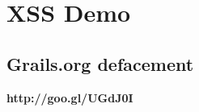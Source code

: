 
\section{XSS Demo}

\subsection{Grails.org defacement}


{
\begin{frame}[plain]
  \vspace{-6cm}
  \begin{center}
    \LARGE\bfseries
    http://goo.gl/UGdJ0I
  \end{center}
\end{frame}
}
